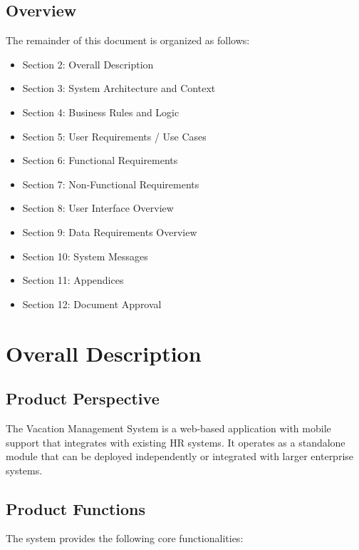 \documentclass[12pt,a4paper]{article}
\begin{document}
\subsection{Overview}
The remainder of this document is organized as follows:
\begin{itemize}
    \item Section 2: Overall Description
    \item Section 3: System Architecture and Context
    \item Section 4: Business Rules and Logic
    \item Section 5: User Requirements / Use Cases
    \item Section 6: Functional Requirements
    \item Section 7: Non-Functional Requirements
    \item Section 8: User Interface Overview
    \item Section 9: Data Requirements Overview
    \item Section 10: System Messages
    \item Section 11: Appendices
    \item Section 12: Document Approval
\end{itemize}

\section{Overall Description}

\subsection{Product Perspective}
The Vacation Management System is a web-based application with mobile support that integrates with existing HR systems. It operates as a standalone module that can be deployed independently or integrated with larger enterprise systems.

\subsection{Product Functions}
The system provides the following core functionalities:
\end{document}
